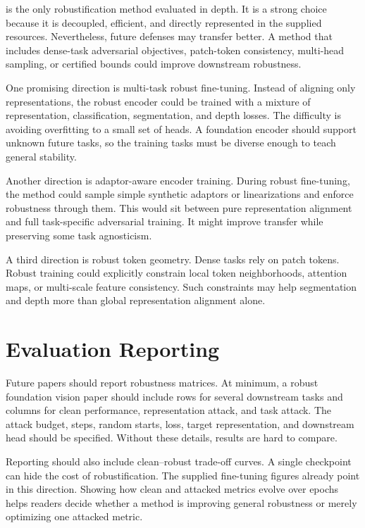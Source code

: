 \DeACL is the only robustification method evaluated in depth. It is a strong choice because it is decoupled, efficient, and directly represented in the supplied resources. Nevertheless, future defenses may transfer better. A method that includes dense-task adversarial objectives, patch-token consistency, multi-head sampling, or certified bounds could improve downstream robustness.

One promising direction is multi-task robust fine-tuning. Instead of aligning only representations, the robust encoder could be trained with a mixture of representation, classification, segmentation, and depth losses. The difficulty is avoiding overfitting to a small set of heads. A foundation encoder should support unknown future tasks, so the training tasks must be diverse enough to teach general stability.

Another direction is adaptor-aware encoder training. During robust fine-tuning, the method could sample simple synthetic adaptors or linearizations and enforce robustness through them. This would sit between pure representation alignment and full task-specific adversarial training. It might improve transfer while preserving some task agnosticism.

A third direction is robust token geometry. Dense tasks rely on patch tokens. Robust training could explicitly constrain local token neighborhoods, attention maps, or multi-scale feature consistency. Such constraints may help segmentation and depth more than global representation alignment alone.

\section{Evaluation Reporting}

Future papers should report robustness matrices. At minimum, a robust foundation vision paper should include rows for several downstream tasks and columns for clean performance, representation attack, and task attack. The attack budget, steps, random starts, loss, target representation, and downstream head should be specified. Without these details, results are hard to compare.

Reporting should also include clean--robust trade-off curves. A single checkpoint can hide the cost of robustification. The supplied fine-tuning figures already point in this direction. Showing how clean and attacked metrics evolve over epochs helps readers decide whether a method is improving general robustness or merely optimizing one attacked metric.

